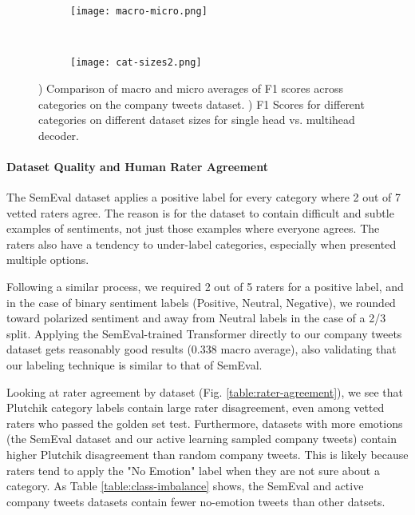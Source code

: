 \documentclass[letterpaper]{article} \usepackage{aaai19}  \usepackage{times}  \usepackage{helvet}  \usepackage{courier}  \usepackage{url}  \usepackage{graphicx}  \usepackage{booktabs}
\begin{document}
\begin{figure*}[htpb!]
\centering
    \begin{subfigure}[t]{0.263\textwidth}
        \centering
        \caption{\label{fig:macro-micro}}
        \texttt{[image: macro-micro.png]}
\end{subfigure}
    ~ 
    \begin{subfigure}[t]{0.717\textwidth}
        \centering
        \caption{\label{fig:cat-sizes}}
        \texttt{[image: cat-sizes2.png]}
\end{subfigure}\caption{) Comparison of macro and micro averages of F1 scores across categories on the company tweets dataset. ) F1 Scores for different categories on different dataset sizes for single head vs. multihead decoder.}
    \label{fig:data-fractions}
\end{figure*}



\paragraph{Dataset Quality and Human Rater Agreement}
The SemEval dataset \cite{SemEval2018Task1} applies a positive label for every category where 2 out of 7 vetted raters agree. The reason is for the dataset to contain difficult and subtle examples of sentiments, not just those examples where everyone agrees. The raters also have a tendency to under-label categories, especially when presented multiple options. 

Following a similar process, we required 2 out of 5 raters for a positive label, and in the case of binary sentiment labels (Positive, Neutral, Negative), we rounded toward polarized sentiment and away from Neutral labels in the case of a 2/3 split. Applying the SemEval-trained Transformer directly to our company tweets dataset gets reasonably good results (0.338 macro average), also validating that our labeling technique is similar to that of SemEval.   

Looking at rater agreement by dataset (Fig. \ref{table:rater-agreement}), we see that Plutchik category labels contain large rater disagreement, even among vetted raters who passed the golden set test. Furthermore, datasets with more emotions (the SemEval dataset and our active learning sampled company tweets) contain higher Plutchik disagreement than random company tweets. This is likely because raters tend to apply the "No Emotion" label when they are not sure about a category. As Table \ref{table:class-imbalance} shows, the SemEval and active company tweets datasets contain fewer no-emotion tweets than other datsets.
\end{document}
